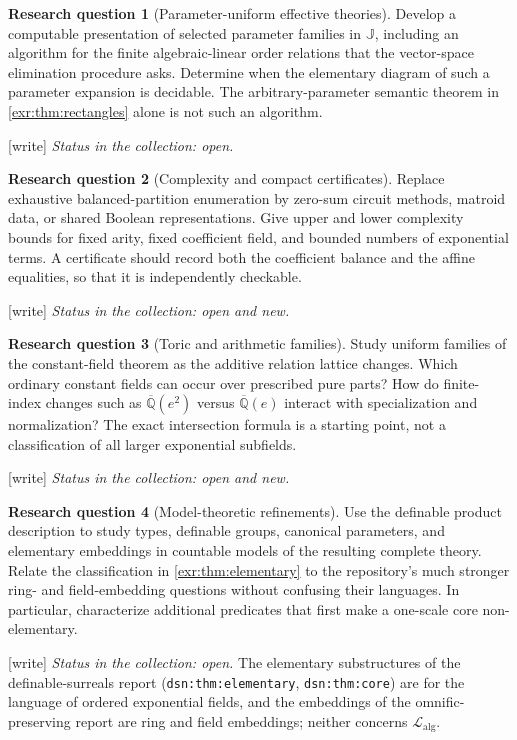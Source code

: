 \documentclass[11pt,letterpaper]{article}
\numberwithin{equation}{section}
\theoremstyle{definition}
\newtheorem{question}{Research question}
\theoremstyle{remark}
\newcommand{\Qb}{\overline{\mathbb Q}}
\newcommand{\J}{\mathbb J}
\newcommand{\Lalg}{\mathcal L_{\mathrm{alg}}}
\newcommand{\lbl}[1]{\nolinkurl{#1}}%
\newcommand{\wtag}{\textup{[write]}}%
\begin{document}
\begin{question}[Parameter-uniform effective theories]\label{exr:q:parameters}
Develop a computable presentation of selected parameter families in $\J$,
including an algorithm for the finite algebraic-linear order relations that the
vector-space elimination procedure asks. Determine when the elementary diagram of
such a parameter expansion is decidable. The arbitrary-parameter semantic theorem
in \cref{exr:thm:rectangles} alone is not such an algorithm.
\end{question}
\wtag{} \emph{Status in the collection: open.}


\begin{question}[Complexity and compact certificates]\label{exr:q:complexity}
Replace exhaustive balanced-partition enumeration by zero-sum circuit methods,
matroid data, or shared Boolean representations. Give upper and lower complexity
bounds for fixed arity, fixed coefficient field, and bounded numbers of
exponential terms. A certificate should record both the coefficient balance and
the affine equalities, so that it is independently checkable.
\end{question}
\wtag{} \emph{Status in the collection: open and new.}


\begin{question}[Toric and arithmetic families]\label{exr:q:toric}
Study uniform families of the constant-field theorem as the additive relation
lattice changes. Which ordinary constant fields can occur over prescribed pure
parts? How do finite-index changes such as $\Qb(e^2)$ versus $\Qb(e)$ interact with
specialization and normalization? The exact intersection formula is a starting
point, not a classification of all larger exponential subfields.
\end{question}
\wtag{} \emph{Status in the collection: open and new.}


\begin{question}[Model-theoretic refinements]\label{exr:q:modeltheory}
Use the definable product description to study types, definable groups, canonical
parameters, and elementary embeddings in countable models of the resulting
complete theory. Relate the classification in \cref{exr:thm:elementary} to the
repository's much stronger ring- and field-embedding questions without confusing
their languages. In particular, characterize additional predicates that first
make a one-scale core non-elementary.
\end{question}
\wtag{} \emph{Status in the collection: open.} The elementary
substructures of the definable-surreals report (\lbl{dsn:thm:elementary},
\lbl{dsn:thm:core}) are for the language of ordered exponential fields, and the
embeddings of the omnific-preserving report are ring and field embeddings;
neither concerns $\Lalg$.
\end{document}

